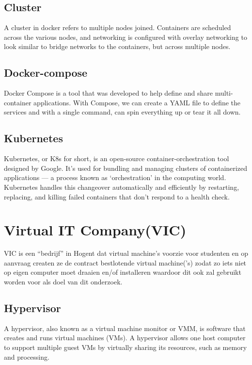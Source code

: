 \subsection{Cluster}
A cluster in docker refers to multiple nodes joined. Containers are scheduled across the various nodes, and networking is configured with overlay networking to look similar to bridge networks to the containers, but across multiple nodes.\autocite{BMitch2019}

\subsection{Docker-compose}
Docker Compose is a tool that was developed to help define and share multi-container applications. With Compose, we can create a YAML file to define the services and with a single command, can spin everything up or tear it all down. \autocite{Docker2023}

\subsection{Kubernetes}
Kubernetes, or K8s for short, is an open-source container-orchestration tool designed by Google. It’s used for bundling and managing clusters of containerized applications — a process known as ‘orchestration’ in the computing world.
Kubernetes handles this changeover automatically and efficiently by restarting, replacing, and killing failed containers that don’t respond to a health check.\autocite{Guthrie2022}

\section{Virtual IT Company(VIC)}
VIC is een ``bedrijf'' in Hogent dat virtual machine's voorzie voor studenten en op aanvraag createn ze de contract bestlotende virtual machine('s) zodat zo iets niet op eigen computer moet draaien en/of installeren waardoor dit ook zal gebruikt worden voor als doel van dit onderzoek.

\subsection{Hypervisor}
A hypervisor, also known as a virtual machine monitor or VMM, is software that creates and runs virtual machines (VMs). A hypervisor allows one host computer to support multiple guest VMs by virtually sharing its resources, such as memory and processing.\autocite{VMware2023a}

